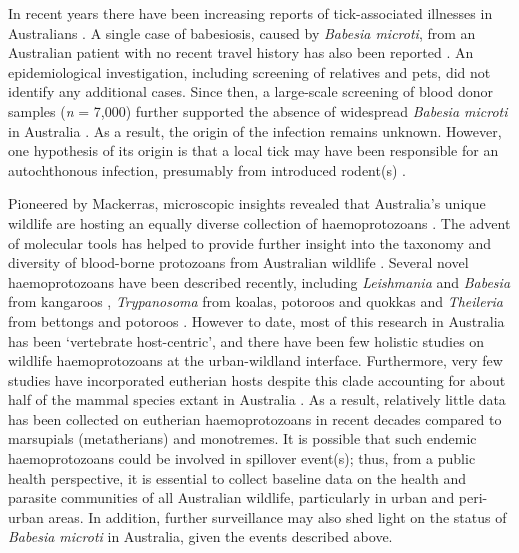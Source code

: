 \documentclass[a4paper, nobind]{templates/ociamthesis}
\begin{document}
In recent years there have been increasing reports of tick-associated illnesses in Australians \autocite{chaladaThereLymelikeDisease2016}.
A single case of babesiosis, caused by \emph{Babesia microti}, from an Australian patient with no recent travel history has also been reported \autocite{senanayakeFirstReportHuman2012,papariniMolecularConfirmationFirst2014}.
An epidemiological investigation, including screening of relatives and pets, did not identify any additional cases.
Since then, a large-scale screening of blood donor samples (\emph{n} = 7,000) further supported the absence of widespread \emph{Babesia microti} in Australia \autocite{faddyNoEvidenceWidespread2019}.
As a result, the origin of the infection remains unknown. However, one hypothesis of its origin is that a local tick may have been responsible for an autochthonous infection, presumably from introduced rodent(s) \autocite{senanayakeFirstReportHuman2012}.

Pioneered by Mackerras, microscopic insights revealed that Australia's unique wildlife are hosting an equally diverse collection of haemoprotozoans \autocite{mackerrasHaematozoaAustralianMammals1959,mackerrasHaematozoaAustralianBirds1960,mackerrasHaematozoaAustralianReptiles1961}.
The advent of molecular tools has helped to provide further insight into the taxonomy and diversity of blood-borne protozoans from Australian wildlife \autocite{adlardPerspectivesBiodiversityParasitic1998,sprattWildlifeParasitologyAustralia2019}.
Several novel haemoprotozoans have been described recently, including \emph{Leishmania} and \emph{Babesia} from kangaroos \autocite{roseCutaneousLeishmaniasisRed2004,dawoodObservationNovelBabesia2013}, \emph{Trypanosoma} from koalas, potoroos and quokkas \autocite{austenMorphologicalMolecularCharacterization2009,mcinnesPotentialImpactNative2011} and \emph{Theileria} from bettongs and potoroos \autocite{leeTheileriaGilbertiSp2009,northoverIncreasedTrypanosomaSpp2019}.
However to date, most of this research in Australia has been `vertebrate host-centric', and there have been few holistic studies on wildlife haemoprotozoans at the urban-wildland interface.
Furthermore, very few studies have incorporated eutherian hosts despite this clade accounting for about half of the mammal species extant in Australia \autocite{flemingGoodBadUgly2016}.
As a result, relatively little data has been collected on eutherian haemoprotozoans in recent decades compared to marsupials (metatherians) and monotremes.
It is possible that such endemic haemoprotozoans could be involved in spillover event(s); thus, from a public health perspective, it is essential to collect baseline data on the health and parasite communities of all Australian wildlife, particularly in urban and peri-urban areas.
In addition, further surveillance may also shed light on the status of \emph{Babesia microti} in Australia, given the events described above.
\end{document}
